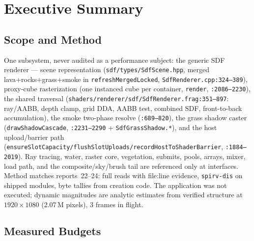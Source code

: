 \documentclass[11pt,a4paper]{article}
\begin{document}
\tableofcontents
\newpage

\section{Executive Summary}

\subsection{Scope and Method}

One subsystem, never audited as a performance subject: the generic SDF
renderer --- scene representation (\texttt{sdf/types/SdfScene.hpp},
merged lava+rocks+grass+smoke in \texttt{refreshMergedLocked},
\texttt{SdfRenderer.cpp:324--389}), proxy-cube rasterization (one instanced
cube per container, \texttt{render}, \texttt{:2086--2230}), the shared
traversal (\texttt{shaders/renderer/sdf/SdfRenderer.frag:351--897}:
ray/AABB, depth clamp, grid DDA, AABB test, combined SDF,
front-to-back accumulation), the smoke two-phase resolve (\texttt{:689--820}), the grass
shadow caster (\texttt{drawShadowCascade}, \texttt{:2231--2290} +
\texttt{SdfGrassShadow.*}), and the host upload/barrier path
(\texttt{ensureSlotCapacity/flushSlotUploads/recordHostToShaderBarrier},
\texttt{:1884--2019}). Ray tracing, water, raster core, vegetation, submits,
pools, arrays, mixer, load path, and the composite/sky/brush tail are
referenced only at interfaces. Method matches reports~22--24: full reads with
file:line evidence, \texttt{spirv-dis} on shipped modules, byte tallies from
creation code. The application was not executed; dynamic magnitudes are
analytic estimates from verified structure at $1920\times1080$ (2.07\,M
pixels), 3 frames in flight.

\subsection{Measured Budgets}
\end{document}
